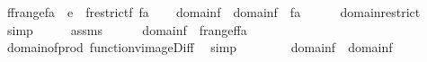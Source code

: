\begin{isabellebody}
\ {\isacharquery}{\kern0pt}f{}{\isacharequal}{\kern0pt}{\isachardoublequoteopen}f{\isacharminus}{\kern0pt}{\isacharbackquote}{\kern0pt}{\isacharbackquote}{\kern0pt}{\isacharparenleft}{\kern0pt}range{\isacharparenleft}{\kern0pt}f{\isacharparenright}{\kern0pt}{\isacharminus}{\kern0pt}a{\isacharparenright}{\kern0pt}\ {\isasymtimes}\ {\isacharbraceleft}{\kern0pt}e{\isacharbraceright}{\kern0pt}{\isachardoublequoteclose}\ \ {\isacharquery}{\kern0pt}f{}{\isacharequal}{\kern0pt}{\isachardoublequoteopen}restrict{\isacharparenleft}{\kern0pt}f{\isacharcomma}{\kern0pt}\ f{\isacharminus}{\kern0pt}{\isacharbackquote}{\kern0pt}{\isacharbackquote}{\kern0pt}a{\isacharparenright}{\kern0pt}{\isachardoublequoteclose}\isanewline
\ \ \isamarkupfalse%
\ {\isachardoublequoteopen}domain{\isacharparenleft}{\kern0pt}{\isacharquery}{\kern0pt}f{}{\isacharparenright}{\kern0pt}\ {\isacharequal}{\kern0pt}\ domain{\isacharparenleft}{\kern0pt}f{\isacharparenright}{\kern0pt}\ {\isasyminter}\ f{\isacharminus}{\kern0pt}{\isacharbackquote}{\kern0pt}{\isacharbackquote}{\kern0pt}a{\isachardoublequoteclose}\isanewline
\ \ \ \ \isamarkupfalse%
\ domain{\isacharunderscore}{\kern0pt}restrict\ \isamarkupfalse%
\ simp\isanewline
\ \ \isamarkupfalse%
\ \isamarkupfalse%
\ assms\ \isanewline
\ \ \isamarkupfalse%
\ {}{\isacharcolon}{\kern0pt}\ {\isachardoublequoteopen}domain{\isacharparenleft}{\kern0pt}{\isacharquery}{\kern0pt}f{}{\isacharparenright}{\kern0pt}\ {\isacharequal}{\kern0pt}\ f{\isacharminus}{\kern0pt}{\isacharbackquote}{\kern0pt}{\isacharbackquote}{\kern0pt}{\isacharparenleft}{\kern0pt}range{\isacharparenleft}{\kern0pt}f{\isacharparenright}{\kern0pt}{\isacharparenright}{\kern0pt}{\isacharminus}{\kern0pt}f{\isacharminus}{\kern0pt}{\isacharbackquote}{\kern0pt}{\isacharbackquote}{\kern0pt}a{\isachardoublequoteclose}\isanewline
\ \ \ \ \isamarkupfalse%
\ domain{\isacharunderscore}{\kern0pt}of{\isacharunderscore}{\kern0pt}prod\ function{\isacharunderscore}{\kern0pt}vimage{\isacharunderscore}{\kern0pt}Diff\ \isamarkupfalse%
\ simp\isanewline
\ \ \isamarkupfalse%
\ \isanewline
\ \ \isamarkupfalse%
\ {\isachardoublequoteopen}domain{\isacharparenleft}{\kern0pt}{\isacharquery}{\kern0pt}f{}{\isacharparenright}{\kern0pt}\ {\isasyminter}\ domain{\isacharparenleft}{\kern0pt}{\isacharquery}{\kern0pt}f{}{\isacharparenright}{\kern0pt}\ {\isacharequal}{\kern0pt}\ {}{\isachardoublequoteclose}\isanewline

\end{isabellebody}
